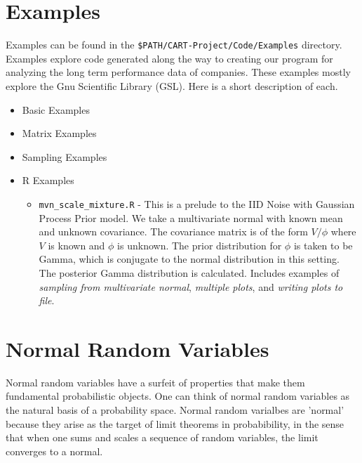 \documentclass{report}
\begin{document}
\large %
\linespread{1.1} %


\chapter{Examples}

Examples can be found in the \texttt{\$PATH/CART-Project/Code/Examples} directory.  Examples explore code generated along the way to creating our program for analyzing the long term performance data of companies.  These examples mostly explore the Gnu Scientific Library (GSL).  Here is a short description of each.
\begin{itemize}

\item Basic Examples

\item Matrix Examples

\item Sampling Examples

\item R Examples
\begin{itemize}
\item \texttt{mvn\_scale\_mixture.R} - This is a prelude to the IID Noise with Gaussian Process Prior model.  We take a multivariate normal with known mean and unknown covariance.  The covariance matrix is of the form $V/\phi$ where $V$ is known and $\phi$ is unknown. The prior distribution for $\phi$ is taken to be Gamma, which is conjugate to the normal distribution in this setting.  The posterior Gamma distribution is calculated.  Includes examples of \emph{sampling from multivariate normal}, \emph{multiple plots}, and \emph{writing plots to file}.
\end{itemize}

\end{itemize}

\chapter{Normal Random Variables}

Normal random variables have a surfeit of properties that make them fundamental probabilistic objects.  One can think of normal random variables as the natural basis of a probability space.  Normal random varialbes are 'normal' because they arise as the target of limit theorems in probabibility, in the sense that when one sums and scales a sequence of random variables, the limit converges to a normal.
\end{document}
